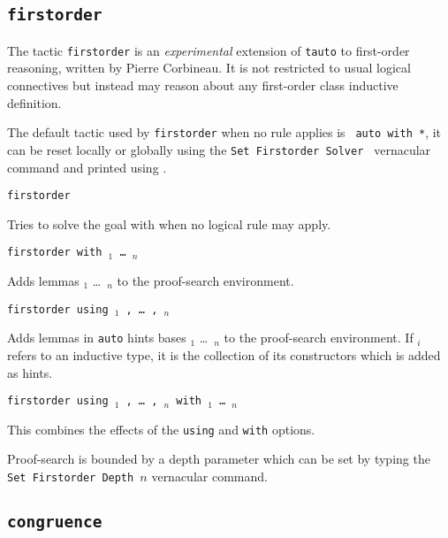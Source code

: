 \begin{coq_example*}
\subsection{\tt firstorder}
\label{firstorder}

The tactic \texttt{firstorder} is an {\it experimental} extension of
\texttt{tauto} to
first-order reasoning, written by Pierre Corbineau.
It is not restricted to usual logical connectives but
instead may reason about any first-order class inductive definition.

The default tactic used by \texttt{firstorder} when no rule applies is {\tt
  auto with *}, it can be reset locally or globally using the {\nobreak
  {\tt Set Firstorder Solver {\tac}}} 
vernacular command and printed using {}.

\begin{Variants}
 \item {\tt firstorder {\tac}}

   Tries to solve the goal with {\tac} when no logical rule may apply.

 \item {\tt firstorder with \ident$_1$ \dots\ \ident$_n$ }

   Adds lemmas \ident$_1$ \dots\ \ident$_n$ to the proof-search
   environment.

 \item {\tt firstorder using {\qualid}$_1$ , \dots\ , {\qualid}$_n$ }

   Adds lemmas in {\tt auto} hints bases {\qualid}$_1$ \dots\ {\qualid}$_n$
   to the proof-search environment. If {\qualid}$_i$ refers to an inductive
   type, it is the collection of its constructors which is added as hints.

\item \texttt{firstorder using {\qualid}$_1$ , \dots\ , {\qualid}$_n$ with \ident$_1$ \dots\ \ident$_n$}

  This combines the effects of the {\tt using} and {\tt with} options.

\end{Variants}

Proof-search is bounded by a depth parameter which can be set by typing the
{\nobreak \tt Set Firstorder Depth $n$} 
vernacular command.


\subsection{\tt congruence}
\label{congruence}


\end{coq_example*}
